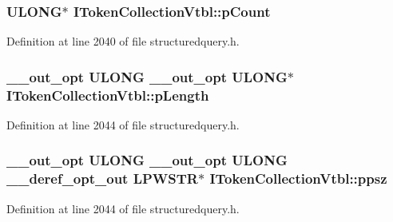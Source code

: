 \subsubsection[{\texorpdfstring{p\+Count}{pCount}}]{ {\bf U\+L\+O\+NG}$\ast$ I\+Token\+Collection\+Vtbl\+::p\+Count}\hypertarget{struct_i_token_collection_vtbl_aa05621489858bf548adf5b16f07acbf3}{}\label{struct_i_token_collection_vtbl_aa05621489858bf548adf5b16f07acbf3}


Definition at line 2040 of file structuredquery.\+h.

\subsubsection[{\texorpdfstring{p\+Length}{pLength}}]{ {\bf \+\_\+\+\_\+out\+\_\+opt} {\bf U\+L\+O\+NG} {\bf \+\_\+\+\_\+out\+\_\+opt} {\bf U\+L\+O\+NG}$\ast$ I\+Token\+Collection\+Vtbl\+::p\+Length}\hypertarget{struct_i_token_collection_vtbl_a2210830ee15e64acb5fef709dbdf4f09}{}\label{struct_i_token_collection_vtbl_a2210830ee15e64acb5fef709dbdf4f09}


Definition at line 2044 of file structuredquery.\+h.

\subsubsection[{\texorpdfstring{ppsz}{ppsz}}]{ {\bf \+\_\+\+\_\+out\+\_\+opt} {\bf U\+L\+O\+NG} {\bf \+\_\+\+\_\+out\+\_\+opt} {\bf U\+L\+O\+NG} {\bf \+\_\+\+\_\+deref\+\_\+opt\+\_\+out} {\bf L\+P\+W\+S\+TR}$\ast$ I\+Token\+Collection\+Vtbl\+::ppsz}\hypertarget{struct_i_token_collection_vtbl_a148ab5d75461a6aacaca5daf1d8a182c}{}\label{struct_i_token_collection_vtbl_a148ab5d75461a6aacaca5daf1d8a182c}


Definition at line 2044 of file structuredquery.\+h.

